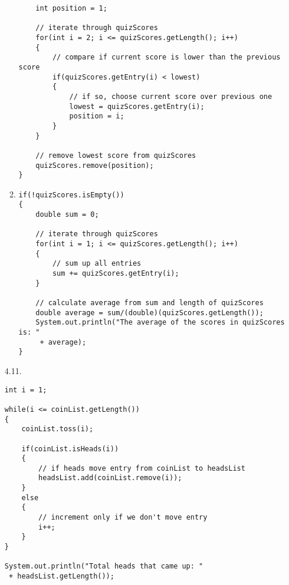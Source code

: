 \documentclass[10pt]{article}
\begin{document}
\begin{enumerate}
\begin{enumerate}
\begin{lstlisting}
    int position = 1;

    // iterate through quizScores
    for(int i = 2; i <= quizScores.getLength(); i++)
    {
        // compare if current score is lower than the previous score
        if(quizScores.getEntry(i) < lowest)
        {
            // if so, choose current score over previous one
            lowest = quizScores.getEntry(i);
            position = i;
        }
    }
    
    // remove lowest score from quizScores
    quizScores.remove(position);
}
					\end{lstlisting}
				
				\item
					\begin{lstlisting}
if(!quizScores.isEmpty())
{
    double sum = 0;

    // iterate through quizScores
    for(int i = 1; i <= quizScores.getLength(); i++)
    {
        // sum up all entries
        sum += quizScores.getEntry(i);
    }

    // calculate average from sum and length of quizScores
    double average = sum/(double)(quizScores.getLength());
    System.out.println("The average of the scores in quizScores is: "
     + average);
}
					\end{lstlisting}
			\end{enumerate}
		
		\item[4.11.]
			\begin{lstlisting}
int i = 1;

while(i <= coinList.getLength())
{
    coinList.toss(i);
    
    if(coinList.isHeads(i))
    {
        // if heads move entry from coinList to headsList
        headsList.add(coinList.remove(i));
    }
    else
    {
        // increment only if we don't move entry
        i++;
    }
}

System.out.println("Total heads that came up: "
 + headsList.getLength());
			\end{lstlisting}
	\end{enumerate}
\end{document}
